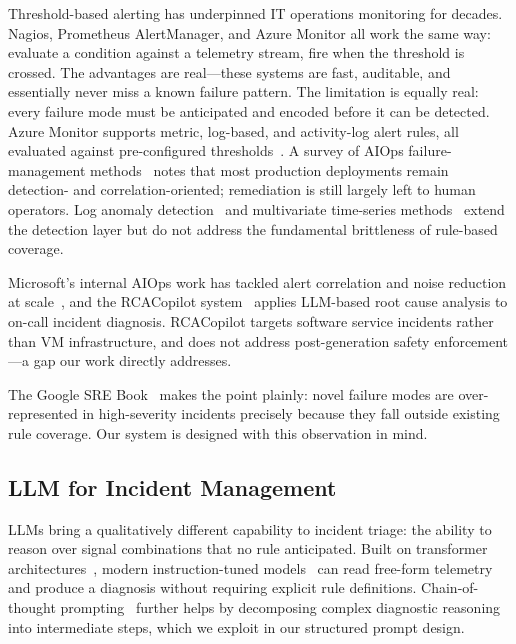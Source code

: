 \documentclass[a4paper,10pt,journal,compsoc]{IEEEtran}
\begin{document}
Threshold-based alerting has underpinned IT operations monitoring for
decades. Nagios, Prometheus AlertManager, and Azure Monitor all work
the same way: evaluate a condition against a telemetry stream, fire
when the threshold is crossed. The advantages are real---these systems
are fast, auditable, and essentially never miss a known failure
pattern. The limitation is equally real: every failure mode must be
anticipated and encoded before it can be detected. Azure Monitor
supports metric, log-based, and activity-log alert rules, all
evaluated against pre-configured
thresholds~\cite{microsoft2024azuremonitor}. A survey of AIOps
failure-management methods~\cite{notaro2021aiops} notes that most
production deployments remain detection- and correlation-oriented;
remediation is still largely left to human operators. Log anomaly
detection~\cite{shi2021log} and multivariate time-series
methods~\cite{ma2021jumpstarting} extend the detection layer but do
not address the fundamental brittleness of rule-based coverage.

Microsoft's internal AIOps work has tackled alert correlation and
noise reduction at scale~\cite{ahmed2023rootcause,xu2024xlifecycle},
and the RCACopilot system~\cite{chen2024rcacopilot} applies LLM-based
root cause analysis to on-call incident diagnosis. RCACopilot targets
software service incidents rather than VM infrastructure, and does not
address post-generation safety enforcement---a gap our work directly
addresses.

The Google SRE Book~\cite{beyer2016sre} makes the point plainly:
novel failure modes are over-represented in high-severity incidents
precisely because they fall outside existing rule coverage. Our system
is designed with this observation in mind.

\subsection{LLM for Incident Management}

LLMs bring a qualitatively different capability to incident triage:
the ability to reason over signal combinations that no rule anticipated.
Built on transformer architectures~\cite{vaswani2017attention,devlin2019bert},
modern instruction-tuned models~\cite{openai2023gpt4} can read
free-form telemetry and produce a diagnosis without requiring explicit
rule definitions. Chain-of-thought prompting~\cite{wei2022cot} further
helps by decomposing complex diagnostic reasoning into intermediate
steps, which we exploit in our structured prompt design.
\end{document}
